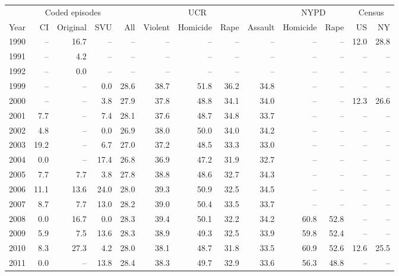 \begin{center}
\label{tab:c_race}
\small
\setlength{\tabcolsep}{3.5pt}
\renewcommand{\arraystretch}{1.08}
\begin{tabular}{@{}rrrrrrrrrrrrr@{}}
\toprule
 & \multicolumn{3}{c}{Coded episodes} & \multicolumn{5}{c}{UCR} & \multicolumn{2}{c}{NYPD} & \multicolumn{2}{c}{Census} \\
\cmidrule(lr){2-4}
\cmidrule(lr){5-9}
\cmidrule(lr){10-11}
\cmidrule(lr){12-13}
Year & CI & Original & SVU & All & Violent & Homicide & Rape & Assault & Homicide & Rape & US & NY \\
\midrule
1990 & -- & 16.7 & -- & -- & -- & -- & -- & -- & -- & -- & 12.0 & 28.8 \\
1991 & -- & 4.2 & -- & -- & -- & -- & -- & -- & -- & -- & -- & -- \\
1992 & -- & 0.0 & -- & -- & -- & -- & -- & -- & -- & -- & -- & -- \\
1999 & -- & -- & 0.0 & 28.6 & 38.7 & 51.8 & 36.2 & 34.8 & -- & -- & -- & -- \\
2000 & -- & -- & 3.8 & 27.9 & 37.8 & 48.8 & 34.1 & 34.0 & -- & -- & 12.3 & 26.6 \\
2001 & 7.7 & -- & 7.4 & 28.1 & 37.6 & 48.7 & 34.8 & 33.7 & -- & -- & -- & -- \\
2002 & 4.8 & -- & 0.0 & 26.9 & 38.0 & 50.0 & 34.0 & 34.2 & -- & -- & -- & -- \\
2003 & 19.2 & -- & 6.7 & 27.0 & 37.2 & 48.5 & 33.3 & 33.0 & -- & -- & -- & -- \\
2004 & 0.0 & -- & 17.4 & 26.8 & 36.9 & 47.2 & 31.9 & 32.7 & -- & -- & -- & -- \\
2005 & 7.7 & 7.7 & 3.8 & 27.8 & 38.8 & 48.6 & 32.7 & 34.3 & -- & -- & -- & -- \\
2006 & 11.1 & 13.6 & 24.0 & 28.0 & 39.3 & 50.9 & 32.5 & 34.5 & -- & -- & -- & -- \\
2007 & 8.7 & 7.7 & 13.0 & 28.2 & 39.0 & 50.4 & 33.5 & 33.7 & -- & -- & -- & -- \\
2008 & 0.0 & 16.7 & 0.0 & 28.3 & 39.4 & 50.1 & 32.2 & 34.2 & 60.8 & 52.8 & -- & -- \\
2009 & 5.9 & 7.5 & 13.6 & 28.3 & 38.9 & 49.3 & 32.5 & 33.9 & 59.8 & 52.4 & -- & -- \\
2010 & 8.3 & 27.3 & 4.2 & 28.0 & 38.1 & 48.7 & 31.8 & 33.5 & 60.9 & 52.6 & 12.6 & 25.5 \\
2011 & 0.0 & -- & 13.8 & 28.4 & 38.3 & 49.7 & 32.9 & 33.6 & 56.3 & 48.8 & -- & -- \\

\end{tabular}
\end{center}
